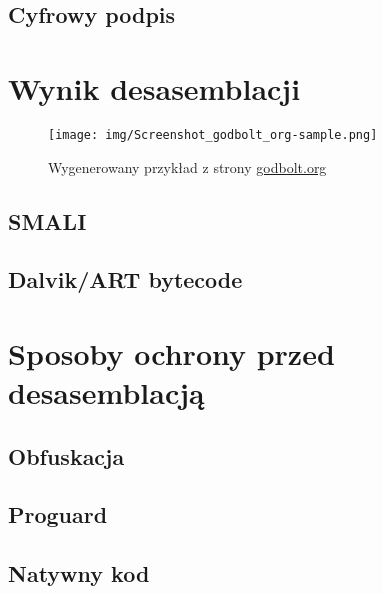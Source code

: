 \documentclass[12pt,a4paper,leqno,oneside,titlepage]{book}
\begin{document}
\section{Cyfrowy podpis}
\label{signing}


\chapter{Wynik desasemblacji}

\begin{figure}[h!]
	\centering
	\texttt{[image: img/Screenshot\_godbolt\_org-sample.png]}
	\caption{Wygenerowany przykład z strony \url{godbolt.org}}
\end{figure}


\section{SMALI}
\label{smali}

\section{Dalvik/ART bytecode}


\chapter{Sposoby ochrony przed desasemblacją}
\section{Obfuskacja}
\section{Proguard}
\section{Natywny kod}
\end{document}
